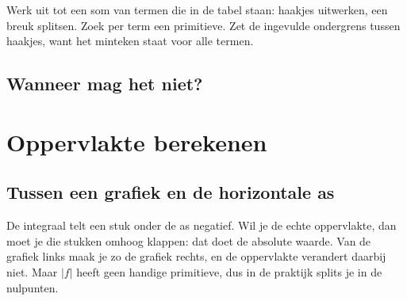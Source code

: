 \begin{werkwijze}
Werk uit tot een som van termen die in de tabel staan: haakjes uitwerken, een breuk splitsen. Zoek per term een primitieve. Zet de ingevulde ondergrens tussen haakjes, want het minteken staat voor alle termen.
\end{werkwijze}


\begin{oefeningen}
\end{oefeningen}

\subsection{Wanneer mag het niet?}


\section{Oppervlakte berekenen}

\subsection{Tussen een grafiek en de horizontale as}

De integraal telt een stuk onder de as negatief. Wil je de echte oppervlakte, dan moet je die stukken omhoog klappen: dat doet de absolute waarde. Van de grafiek links maak je zo de grafiek rechts, en de oppervlakte verandert daarbij niet. Maar $|f|$ heeft geen handige primitieve, dus in de praktijk splits je in de nulpunten.

